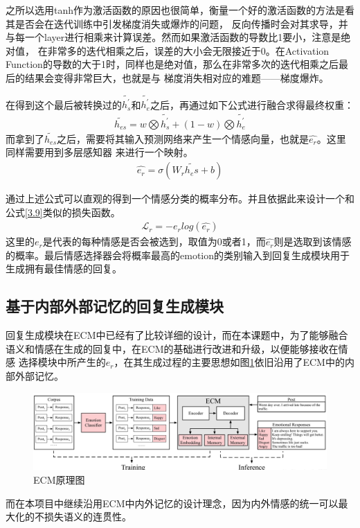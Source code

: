 \documentclass[supercite]{HustGraduPaper}
\theoremstyle{definition}
\begin{document}
之所以选用tanh作为激活函数的原因也很简单，衡量一个好的激活函数的方法是看其是否会在迭代训练中引发梯度消失或爆炸的问题，
反向传播时会对其求导，并与每一个layer进行相乘来计算误差。然而如果激活函数的导数比1要小，注意是绝对值，
在非常多的迭代相乘之后，误差的大小会无限接近于0。在Activation Function的导数的大于1时，同样也是绝对值，那么在非常多次的迭代相乘之后最后的结果会变得非常巨大，也就是与
梯度消失相对应的难题——梯度爆炸。


在得到这个最后被转换过的$\widetilde{h_s^{'}}$和$\widetilde{h_e^{'}}$之后，再通过如下公式进行融合求得最终权重：
\begin{align}
  {\widetilde{h_{es}}} = w \bigotimes {\widetilde{h_s^{'}}} + (1 - w) \bigotimes {\widetilde{h_e^{'}}} \label{3.13}
\end{align}
而拿到了$\widetilde{h_{es}}$之后，需要将其输入预测网络来产生一个情感向量，也就是$\hat{e_r}$。这里同样需要用到多层感知器
来进行一个映射。
\begin{align}
  \hat{e_r} = \sigma(W_r \widetilde{h_es} + b) \label{3.14}
\end{align}

通过上述公式可以直观的得到一个情感分类的概率分布。并且依据此来设计一个和公式\ref{3.9}类似的损失函数。
\begin{align}
  \mathcal{L}_r = -e_r log(\hat{e_r}) \label{3.15} 
\end{align}
这里的$e_r$是代表的每种情感是否会被选到，取值为0或者1，而$\hat{e_r}$则是选取到该情感的概率。最后情感选择器会将概率最高的emotion的类别输入到回复生成模块用于生成拥有最佳情感的回复。

\subsection{基于内部外部记忆的回复生成模块}
回复生成模块在ECM\cite{DBLP:journals/corr/ZhouHZZL17}中已经有了比较详细的设计，而在本课题中，为了能够融合语义和情感在生成的回复中，在ECM的基础进行改进和升级，以便能够接收在情感
选择模块中所产生的$e_r$，在其生成过程的主要思想如图\ref{Fig.ECM}依旧沿用了ECM中的内部外部记忆。
\begin{figure}[htbp] %
  \centering %
  \includegraphics[width=1\textwidth]{images/ECM.png} %
  \caption{ECM原理图} %
  \label{Fig.ECM} %
\end{figure}
而在本项目中继续沿用ECM中内外记忆的设计理念，因为内外情感的统一可以最大化的不损失语义的连贯性。
\end{document}
